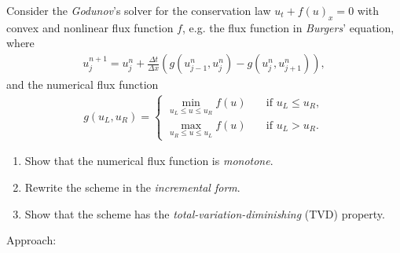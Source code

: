 \documentclass[12pt]{article}
\begin{document}
\clearpage
\begin{example}
	Consider the \emph{Godunov}'s solver for
	the conservation law $u_t+f(u)_x = 0$
	with convex and nonlinear flux function $f$,
	e.g. the flux function in \emph{Burgers}' equation, where
	\begin{align*}
		u_{j}^{n+1} = u_j^n +
		\frac{ \Delta t}{\Delta x}
		\left(
		g( u_{j-1}^n,  u_{j}^n) - g( u_j^n,  u_{j+1}^n)
		\right),
	\end{align*}
	and the numerical flux function
	\begin{align*}
		g(u_L,u_R)
		=
		\begin{cases}
			\underset{ u_L \leq u \leq u_R}{\min}  f(u) \quad & \text{if } u_L \leq u_R , \\
			\underset{ u_R \leq u \leq u_L}{\max}  f(u) \quad & \text{if } u_L > u_R.
		\end{cases}
	\end{align*}
	\begin{enumerate}
		\item Show that the numerical flux function is \emph{monotone}.
		\item Rewrite the scheme in the \emph{incremental form}.
		\item Show that the scheme has the
		      \emph{total-variation-diminishing} (TVD) property.
	\end{enumerate}
\end{example}
Approach:
\end{document}
